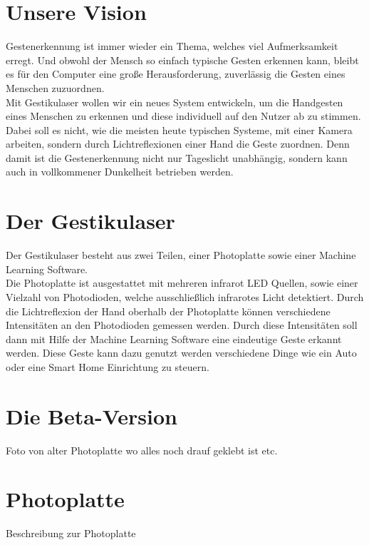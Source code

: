 \documentclass{sciposter}
\begin{document}
\begin{multicols}{3}
\setlength{\parindent}{2em}

\section{Unsere Vision}
Gestenerkennung ist immer wieder ein Thema, welches viel Aufmerksamkeit erregt. Und obwohl der Mensch so einfach typische Gesten erkennen kann, bleibt es für den Computer eine große Herausforderung, zuverlässig die Gesten eines Menschen zuzuordnen. \\
Mit Gestikulaser wollen wir ein neues System entwickeln, um die Handgesten eines Menschen zu erkennen und diese individuell auf den Nutzer ab zu stimmen. Dabei soll es nicht, wie die meisten heute typischen Systeme, mit einer Kamera arbeiten, sondern durch Lichtreflexionen einer Hand die Geste zuordnen. Denn damit ist die Gestenerkennung nicht nur Tageslicht unabhängig, sondern kann auch in vollkommener Dunkelheit betrieben werden. \\

\section{Der Gestikulaser}
Der Gestikulaser besteht aus zwei Teilen, einer Photoplatte sowie einer Machine Learning Software. \\
Die Photoplatte ist ausgestattet mit mehreren infrarot LED Quellen, sowie einer Vielzahl von Photodioden, welche ausschließlich infrarotes Licht detektiert. Durch die Lichtreflexion der Hand oberhalb der Photoplatte können verschiedene Intensitäten an den Photodioden gemessen werden. Durch diese Intensitäten soll dann mit Hilfe der Machine Learning Software eine eindeutige Geste erkannt werden. Diese Geste kann dazu genutzt werden verschiedene Dinge wie ein Auto oder eine Smart Home Einrichtung zu steuern.


\section{Die Beta-Version}
Foto von alter Photoplatte wo alles noch drauf geklebt ist etc.

\section{Photoplatte}
Beschreibung zur Photoplatte \\


\end{multicols}
\end{document}
